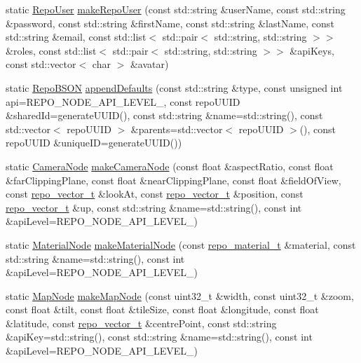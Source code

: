 \begin{DoxyCompactItemize}
\item 
static \hyperlink{classrepo_1_1core_1_1model_1_1_repo_user}{Repo\+User} \hyperlink{classrepo_1_1core_1_1model_1_1_repo_b_s_o_n_factory_a71f31d9f55dd79764f955f113d0620a2}{make\+Repo\+User} (const std\+::string \&user\+Name, const std\+::string \&password, const std\+::string \&first\+Name, const std\+::string \&last\+Name, const std\+::string \&email, const std\+::list$<$ std\+::pair$<$ std\+::string, std\+::string $>$$>$ \&roles, const std\+::list$<$ std\+::pair$<$ std\+::string, std\+::string $>$$>$ \&api\+Keys, const std\+::vector$<$ char $>$ \&avatar)
\item 
static \hyperlink{classrepo_1_1core_1_1model_1_1_repo_b_s_o_n}{Repo\+B\+S\+O\+N} \hyperlink{classrepo_1_1core_1_1model_1_1_repo_b_s_o_n_factory_addddc912d9cda2582e39689832c67c64}{append\+Defaults} (const std\+::string \&type, const unsigned int api=R\+E\+P\+O\+\_\+\+N\+O\+D\+E\+\_\+\+A\+P\+I\+\_\+\+L\+E\+V\+E\+L\+\_, const repo\+U\+U\+I\+D \&shared\+Id=generate\+U\+U\+I\+D(), const std\+::string \&name=std\+::string(), const std\+::vector$<$ repo\+U\+U\+I\+D $>$ \&parents=std\+::vector$<$ repo\+U\+U\+I\+D $>$(), const repo\+U\+U\+I\+D \&unique\+I\+D=generate\+U\+U\+I\+D())
\item 
static \hyperlink{classrepo_1_1core_1_1model_1_1_camera_node}{Camera\+Node} \hyperlink{classrepo_1_1core_1_1model_1_1_repo_b_s_o_n_factory_a23353f1a12968ec60bcd7013df3dd1dc}{make\+Camera\+Node} (const float \&aspect\+Ratio, const float \&far\+Clipping\+Plane, const float \&near\+Clipping\+Plane, const float \&field\+Of\+View, const \hyperlink{structrepo__vector__t}{repo\+\_\+vector\+\_\+t} \&look\+At, const \hyperlink{structrepo__vector__t}{repo\+\_\+vector\+\_\+t} \&position, const \hyperlink{structrepo__vector__t}{repo\+\_\+vector\+\_\+t} \&up, const std\+::string \&name=std\+::string(), const int \&api\+Level=R\+E\+P\+O\+\_\+\+N\+O\+D\+E\+\_\+\+A\+P\+I\+\_\+\+L\+E\+V\+E\+L\+\_)
\item 
static \hyperlink{classrepo_1_1core_1_1model_1_1_material_node}{Material\+Node} \hyperlink{classrepo_1_1core_1_1model_1_1_repo_b_s_o_n_factory_a045a2f1546300e6de1590ca4c0200050}{make\+Material\+Node} (const \hyperlink{structrepo__material__t}{repo\+\_\+material\+\_\+t} \&material, const std\+::string \&name=std\+::string(), const int \&api\+Level=R\+E\+P\+O\+\_\+\+N\+O\+D\+E\+\_\+\+A\+P\+I\+\_\+\+L\+E\+V\+E\+L\+\_)
\item 
static \hyperlink{classrepo_1_1core_1_1model_1_1_map_node}{Map\+Node} \hyperlink{classrepo_1_1core_1_1model_1_1_repo_b_s_o_n_factory_ad675c473a8b9c34445bb3da33e7976bf}{make\+Map\+Node} (const uint32\+\_\+t \&width, const uint32\+\_\+t \&zoom, const float \&tilt, const float \&tile\+Size, const float \&longitude, const float \&latitude, const \hyperlink{structrepo__vector__t}{repo\+\_\+vector\+\_\+t} \&centre\+Point, const std\+::string \&api\+Key=std\+::string(), const std\+::string \&name=std\+::string(), const int \&api\+Level=R\+E\+P\+O\+\_\+\+N\+O\+D\+E\+\_\+\+A\+P\+I\+\_\+\+L\+E\+V\+E\+L\+\_)

\end{DoxyCompactItemize}
